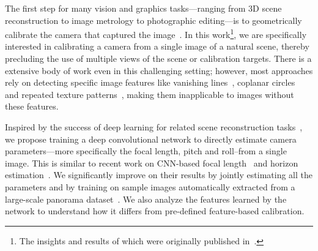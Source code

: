 


The first step for many vision and graphics tasks---ranging from 3D scene reconstruction to image metrology to photographic editing---is to geometrically calibrate the camera that captured the image~\cite{Hartley2004}. In this work\footnote{The insights and results of which were originally published in~\cite{holdgeoffroy-cvpr-18}.}, we are specifically interested in calibrating a camera from a single image of a natural scene, thereby precluding the use of multiple views of the scene or calibration targets. There is a extensive body of work even in this challenging setting; however, most approaches rely on detecting specific image features like vanishing lines~\cite{Lee2014}, coplanar circles~\cite{Chen2004} and repeated texture patterns~\cite{Schaffalitzky2000,Criminisi00,Pritts2014}, making them inapplicable to images without these features.

Inspired by the success of deep learning for related scene reconstruction tasks~\cite{choy20163d,bianco2017single}, we propose training a deep convolutional network to directly estimate camera parameters---more specifically the focal length, pitch and roll--from a single image. This is similar to recent work on CNN-based focal length~\cite{Workman2015a} and horizon estimation~\cite{Workman2016}. We significantly improve on their results by jointly estimating all the parameters and by training on sample images automatically extracted from a large-scale panorama dataset~\cite{Xiao2012}. We also analyze the features learned by the network to understand how it differs from pre-defined feature-based calibration.

